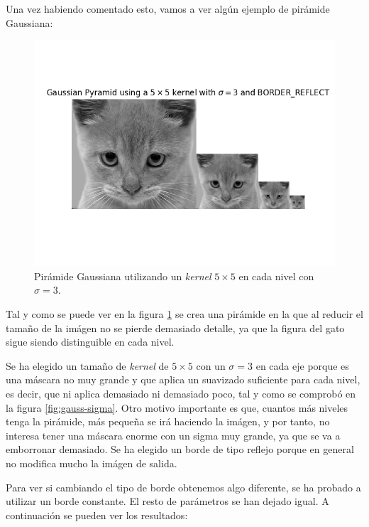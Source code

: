\documentclass[11pt,a4paper]{article}
\begin{document}
Una vez habiendo comentado esto, vamos a ver algún ejemplo de pirámide Gaussiana:

\begin{figure}[H]
\centering
\includegraphics[scale=0.6]{img/gauss-pyr-1.png}
\caption{Pirámide Gaussiana utilizando un \textit{kernel} $5 \times 5$ en cada nivel con $\sigma = 3$.}
\label{fig:gauss-pyr-1}
\end{figure}

Tal y como se puede ver en la figura \ref{fig:gauss-pyr-1} se crea una pirámide en la que al reducir el tamaño de la
imágen no se pierde demasiado detalle, ya que la figura del gato sigue siendo distinguible en cada nivel.

Se ha elegido un tamaño de \textit{kernel} de $5 \times 5$ con un $\sigma = 3$ en cada eje porque es una máscara no
muy grande y que aplica un suavizado suficiente para cada nivel, es decir, que ni aplica demasiado ni demasiado poco, tal
y como se comprobó en la figura \ref{fig:gauss-sigma}. Otro motivo importante es que, cuantos más niveles tenga la pirámide,
más pequeña se irá haciendo la imágen, y por tanto, no interesa tener una máscara enorme con un sigma muy grande, ya que se
va a emborronar demasiado. Se ha elegido un borde de tipo reflejo porque en general no modifica mucho la imágen de salida.

Para ver si cambiando el tipo de borde obtenemos algo diferente, se ha probado a utilizar un borde constante.
El resto de parámetros se han dejado igual. A continuación se pueden ver los resultados:
\end{document}
